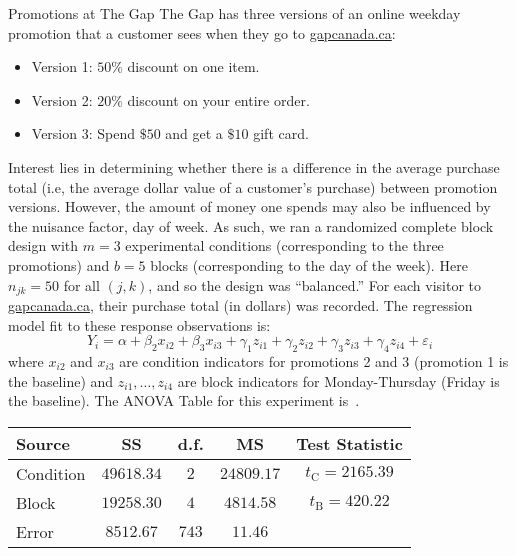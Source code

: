 \begin{Example}{Promotions at The Gap}{}
      The Gap has three versions of an online weekday promotion that a customer sees when they go to \href{https://www.gapcanada.ca/}{gapcanada.ca}:
      \begin{itemize}
            \item Version 1: $ 50\% $ discount on one item.
            \item Version 2: $ 20\% $ discount on your entire order.
            \item Version 3: Spend $ \$ 50 $ and get a $ \$ 10 $ gift card.
      \end{itemize}
      Interest lies in determining whether there is a difference in the average purchase total (i.e, the average
      dollar value of a customer's purchase) between promotion versions. However, the amount of money one
      spends may also be influenced by the nuisance factor, day of week. As such, we ran a randomized complete block
      design with $m = 3$ experimental conditions (corresponding to the three promotions) and $b = 5$
      blocks (corresponding to the day of the week). Here $n_{jk}=50$ for all $(j, k)$, and so the design was ``balanced.'' For
      each visitor to \href{https://www.gapcanada.ca/}{gapcanada.ca}, their purchase total (in dollars) was recorded.
      The regression model fit to these response observations is:
      \[ Y_i=\alpha+\beta_2 x_{i2}+\beta_3 x_{i3}+\gamma_1 z_{i1}+\gamma_2 z_{i2}+\gamma_3 z_{i3}+\gamma_4 z_{i4}+\varepsilon_i \]
      where $x_{i2}$ and $x_{i3}$ are condition indicators for promotions 2 and 3 (promotion 1 is the baseline) and $ z_{i1},\ldots,z_{i4} $
      are block indicators for Monday-Thursday (Friday is the baseline). The ANOVA Table for this experiment is~.
      \begin{center}
            \captionsetup{type=table}
            \label{GAPANOVA}
            \begin{NiceTabular}{|l|c|c|c|c|}
                  \toprule
                  Source    & SS           & d.f.    & MS           & Test Statistic             \\
                  \midrule
                  Condition & $ 49618.34 $ & $ 2 $   & $ 24809.17 $ & $ t_\text{C}=2165.39 $ \\
                  Block     & $ 19258.30 $ & $ 4 $   & $ 4814.58 $  & $ t_\text{B}=420.22 $  \\
                  Error     & $ 8512.67 $  & $ 743 $ & $ 11.46 $    &                        \\

\end{NiceTabular}
\end{center}
\end{Example}
